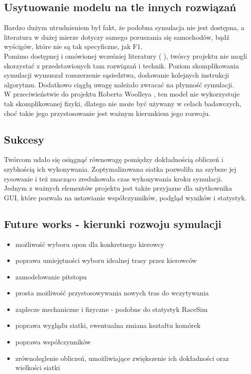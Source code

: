 \documentclass{article}
\begin{document}
\subsection{Usytuowanie modelu na tle innych rozwiązań}
Bardzo dużym utrudnieniem był fakt, że podobna symulacja nie jest dostępna, a literatura w dużej mierze dotyczy samego poruszania się samochodów, bądź wyścigów, które nie są tak specyficzne, jak F1. \\

Pomimo dostępnej i omówionej wcześniej literatury (\cite{gca} \cite{race} \cite{was}), twórcy projektu nie mogli skorzystać z przedstawionych tam rozwiązań i technik. Poziom skomplikowania symulacji wymuszał rozszerzenie sąsiedztwa, dodawanie kolejnych instrukcji algorytmu. Dodatkowo ciągłą uwagę należało zwracać na płynność symulacji. \\

W przeciwieństwie do projektu Roberta Woolleya \cite{woolley}, ten model nie wykorzystuje tak skomplikowanej fizyki, dlatego nie może być używany w celach badawczych, choć takie jego przystosowanie jest ważnym kierunkiem jego rozwoju.

\subsection{Sukcesy}
Twórcom udało się osiągnąć równowagę pomiędzy dokładnością obliczeń i szybkością ich wykonywania. Zoptymalizowana siatka pozwoliła na szybsze jej rysowanie i też znacząco zredukowała czas wykonywania kroku symulacji. \\

Jednym z ważnych elementów projektu jest także przyjazne dla użytkownika GUI, które pozwala na ustawianie współczynników, podgląd wyników i statystyk. 

\subsection{Future works - kierunki rozwoju symulacji}
\begin{itemize}
\item możliwość wyboru opon dla konkretnego kierowcy
\item poprawa umiejętności wyboru idealnej trasy przez kierowców
\item zamodelowanie pitstopu
\item prosta możliwość przystosowywania nowych tras do wczytywania
\item zaplecze mechaniczne i fizyczne - podobne do statystyk RaceSim \cite{race}
\item poprawa wyglądu siatki, ewentualna zmiana kształtu komórek
\item poprawa współczynników
\item zrównoleglenie obliczeń, umożliwiające zwiększenie ich dokładności oraz wielkości siatki
\end{itemize}



\end{document}
